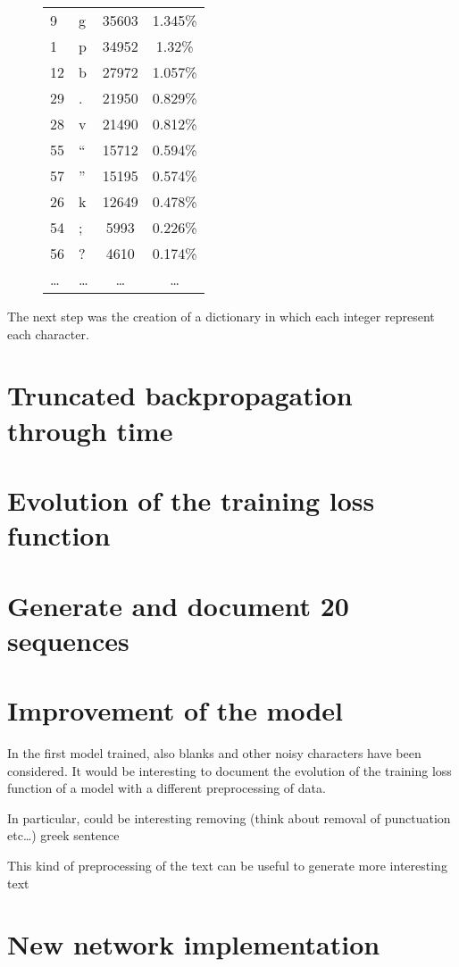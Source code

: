 \documentclass[a4paper,12pt]{article} %
\begin{document}
\begin{figure}[H]
\begin{tabular}{llcc}
		9        &         g &               35603 &             1.345\% \\
		1        &         p &               34952 &              1.32\% \\
		12       &         b &               27972 &             1.057\% \\
		29       &         . &               21950 &             0.829\% \\
		28       &         v &               21490 &             0.812\% \\
		55       &         “ &               15712 &             0.594\% \\
		57       &         ” &               15195 &             0.574\% \\
		26       &         k &               12649 &             0.478\% \\
		54       &         ; &                5993 &             0.226\% \\
		56       &         ? &                4610 &             0.174\% \\
		\dots       &         \dots &                \dots &             \dots 
		\\
		\bottomrule
	\end{tabular}
	\label{tab:statistics}
	\end{figure}

	
	The next step was the creation of a dictionary in which each integer 
	represent each character. 
	
	
	\section{Truncated backpropagation through time}
	
	\section{Evolution of the training loss function}
	
	\section{Generate and document 20 sequences}
	
	\section{Improvement of the model}
	In the first model trained, also blanks and other noisy characters have 
	been considered. It would be interesting to document the evolution of the 
	training loss function of a model with a different preprocessing of data.
	
	In particular, could be interesting removing 
	(think about removal of punctuation etc…)
	greek sentence
	
	This kind of preprocessing of the text can be useful to generate more
	interesting text 
	
	
	\section{New network implementation}
	
	
\end{document}
